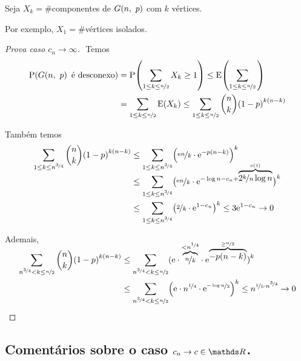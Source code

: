 {Seja $X_k=\#$componentes de $G\l(n,\ p\r)$ com $k$ vértices.

Por exemplo, $X_1=\#$vértices isolados.

\begin{proof}[Prova caso $c_n\rightarrow\infty$]
  $ $\newline
  Temos
  \vspace*{-\baselineskip}
  \begin{align*}
    \P\l(G\l(n,\ p\r)\text{ é desconexo}\r)
      &=    \P\l(\sum_{1\leq k\leq\nf{n}{2}}X_k\geq 1\r)
      \leq  \E\l(\sum_{1\leq k\leq\nf{n}{2}}\r)                                                     \\
      &=    \sum_{1\leq k\leq\nf{n}{2}}\E\l(X_k\r)
      \leq  \sum_{1\leq k\leq\nf{n}{2}}\binom{n}{k}\l(1-p\r)^{k\l(n-k\r)}
  \end{align*}

  Também temos
  \begin{align*}
    \sum_{1\leq k\leq n^{\nf{3}{4}}}\binom{n}{k}\l(1-p\r)^{k\l(n-k\r)}
      &\leq \sum_{1\leq k\leq n^{\nf{3}{4}}}\l(\nf{\e n}{k}\d\e^{-p\l(n-k\r)}\r)^k                  \\
      &\leq \sum_{1\leq k\leq n^{\nf{3}{4}}}
              \l(\nf{\e n}{k}\d\e^{-\log n-c_n+\smash{\overbrace{2\nf{k}{n}\log n}^{o(1)}}}\r)^k    \\
      &\leq \sum_{1\leq k\leq n^{\nf{3}{4}}}\l(\nf{2}{k}\d\e^{1-c_n}\r)^k
      \leq  3\e^{1-c_n} 
      \rightarrow 0
  \end{align*}

  Ademais,
  \begin{align*}
    \sum_{n^{\nf{3}{4}}<k\leq\nf{n}{2}}\binom{n}{k}\l(1-p\r)^{k\l(n-k\r)}
      &\leq \sum_{n^{\nf{3}{4}}<k\leq\nf{n}{2}}
              \l(\e\d\smash{\overbrace{\nf{n}{k}}^{<n^{\nf{1}{4}}}}\d
              \e^{\smash{\overbrace{-p\l(n-k\r)}^{\geq\nf{n}{2}}}}\r)^k                             \\
      &\leq \sum_{n^{\nf{3}{4}}<k\leq\nf{n}{2}}\l(\e\d n^{\nf{1}{4}}\d\e^{\nf{-\log n}{2}}\r)^k
      \leq  n^{\nf{1}{5}\d n^{\nf{3}{4}}}
      \rightarrow 0
  \end{align*}
\end{proof}

\clearpage
\subsection*{\normalfont Comentários sobre o caso $c_n\rightarrow c\in\Reals$.}$ $\newline

}
